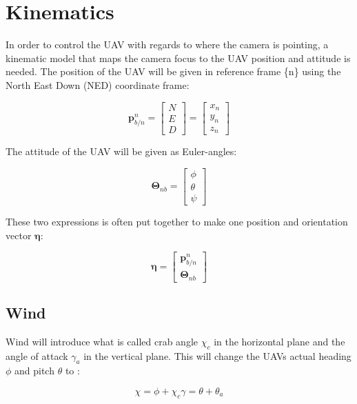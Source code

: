 \section{Kinematics}
In order to control the UAV with regards to where the camera is pointing, a kinematic model that maps the camera focus to the UAV position and attitude is needed. The position of the UAV will be given in reference frame \{n\} using the North East Down (NED) coordinate frame:

\begin{equation}
	\bm{p}_{b/n}^n =
	\begin{bmatrix}
		N \\ E \\ D
	\end{bmatrix}
	=
	\begin{bmatrix}
		x_n \\ y_n \\ z_n
	\end{bmatrix}
\end{equation}

The attitude of the UAV will be given as Euler-angles:

\begin{equation}
	\bm{\Theta}_{nb} = 
	\begin{bmatrix}
		\phi \\ \theta \\ \psi
	\end{bmatrix}
\end{equation}
	
These two expressions is often put together to make one position and orientation vector $\bm{\eta}$:

\begin{equation}
	\bm{\eta} =
	\begin{bmatrix}
		\bm{p}_{b/n}^n \\
		\bm{\Theta}_{nb}
	\end{bmatrix}
\end{equation}
	
\subsection{Wind}
Wind will introduce what is called crab angle $\chi_c$ in the horizontal plane and the angle of attack $\gamma_a$ in the vertical plane. This will change the UAVs actual heading $\phi$ and pitch $\theta$ to \cite{suaBEARD}:

\begin{subequations}
\begin{equation}
	\chi = \phi + \chi_c
\end{equation}
\begin{equation}
	\gamma = \theta + \theta_a
\end{equation}
\end{subequations}

